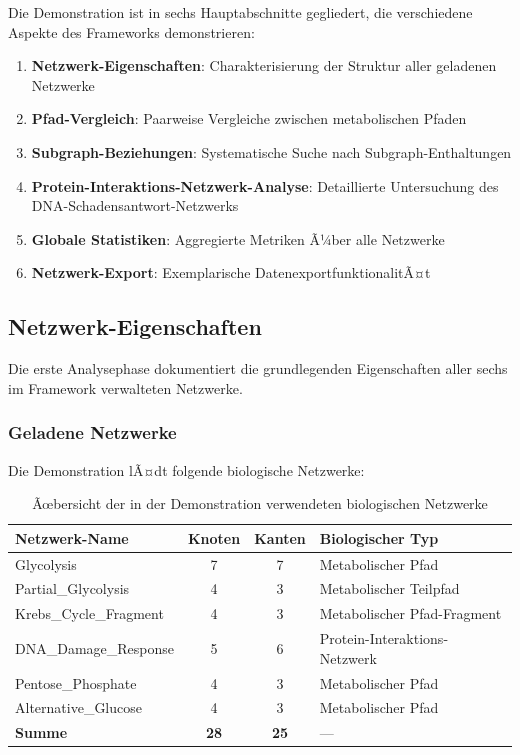﻿\documentclass[a4paper,12pt]{article}
\theoremstyle{definition}
\begin{document}
Die Demonstration ist in sechs Hauptabschnitte gegliedert, die verschiedene Aspekte des Frameworks demonstrieren:

\begin{enumerate}
	\item \textbf{Netzwerk-Eigenschaften}: Charakterisierung der Struktur aller geladenen Netzwerke
	\item \textbf{Pfad-Vergleich}: Paarweise Vergleiche zwischen metabolischen Pfaden
	\item \textbf{Subgraph-Beziehungen}: Systematische Suche nach Subgraph-Enthaltungen
	\item \textbf{Protein-Interaktions-Netzwerk-Analyse}: Detaillierte Untersuchung des DNA-Schadensantwort-Netzwerks
	\item \textbf{Globale Statistiken}: Aggregierte Metriken Ã¼ber alle Netzwerke
	\item \textbf{Netzwerk-Export}: Exemplarische DatenexportfunktionalitÃ¤t
\end{enumerate}

\subsection{Netzwerk-Eigenschaften}

Die erste Analysephase dokumentiert die grundlegenden Eigenschaften aller sechs im Framework verwalteten Netzwerke.

\subsubsection{Geladene Netzwerke}

Die Demonstration lÃ¤dt folgende biologische Netzwerke:

\begin{table}[h]
	\centering
	\caption{Ãœbersicht der in der Demonstration verwendeten biologischen Netzwerke}
	\label{tab:demo_networks}
	\begin{tabular}{|l|c|c|l|}
		\hline
		\textbf{Netzwerk-Name} & \textbf{Knoten} & \textbf{Kanten} & \textbf{Biologischer Typ} \\
		\hline
		Glycolysis & 7 & 7 & Metabolischer Pfad \\
		Partial\_Glycolysis & 4 & 3 & Metabolischer Teilpfad \\
		Krebs\_Cycle\_Fragment & 4 & 3 & Metabolischer Pfad-Fragment \\
		DNA\_Damage\_Response & 5 & 6 & Protein-Interaktions-Netzwerk \\
		Pentose\_Phosphate & 4 & 3 & Metabolischer Pfad \\
		Alternative\_Glucose & 4 & 3 & Metabolischer Pfad \\
		\hline
		\textbf{Summe} & \textbf{28} & \textbf{25} & --- \\
		\hline
	\end{tabular}
\end{table}
\end{document}
